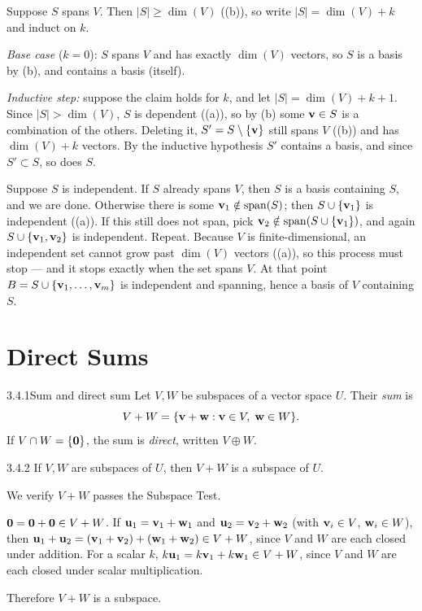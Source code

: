 \begin{prf}
 Suppose $S$ spans $V$. Then $|S|\ge\dim(V)$ ((b)), so write $|S|=\dim(V)+k$ and induct on $k$.

\emph{Base case} ($k=0$): $S$ spans $V$ and has exactly $\dim(V)$ vectors, so $S$ is a basis by (b), and contains a basis (itself).

\emph{Inductive step:} suppose the claim holds for $k$, and let $|S|=\dim(V)+k+1$. Since $|S|>\dim(V)$, $S$ is dependent ((a)), so by (b) some $\mathbf{v}\in S$ is a combination of the others. Deleting it, $S'=S\setminus\{\mathbf{v}\}$ still spans $V$ ((b)) and has $\dim(V)+k$ vectors. By the inductive hypothesis $S'$ contains a basis, and since $S'\subset S$, so does $S$.

 Suppose $S$ is independent. If $S$ already spans $V$, then $S$ is a basis containing $S$, and we are done. Otherwise there is some $\mathbf{v}_1\notin\operatorname{span}(S)$; then $S\cup\{\mathbf{v}_1\}$ is independent ((a)).
If this still does not span, pick $\mathbf{v}_2\notin\operatorname{span}(S\cup\{\mathbf{v}_1\})$, and again $S\cup\{\mathbf{v}_1,\mathbf{v}_2\}$ is independent. Repeat. Because $V$ is finite-dimensional, an independent set cannot grow past $\dim(V)$ vectors ((a)), so this process must stop --- and it stops exactly when the set spans $V$. At that point $B=S\cup\{\mathbf{v}_1,\dots,\mathbf{v}_m\}$ is independent and spanning, hence a basis of $V$ containing $S$.
\end{prf}

\section{Direct Sums}
\label{sec:3.4}

\begin{defns}{3.4.1}{Sum and direct sum}
Let $V,W$ be subspaces of a vector space $U$. Their \emph{sum} is
\[
V+W=\{\mathbf{v}+\mathbf{w}:\mathbf{v}\in V,\;\mathbf{w}\in W\}.
\]
If $V\cap W=\{\mathbf{0}\}$, the sum is \emph{direct}, written $V\oplus W$.
\end{defns}

\begin{thms}{3.4.2}{}
If $V,W$ are subspaces of $U$, then $V+W$ is a subspace of $U$.
\end{thms}

\begin{prf}
We verify $V+W$ passes the Subspace Test.
\begin{checks}
 $\mathbf{0}=\mathbf{0}+\mathbf{0}\in V+W$.
 If $\mathbf{u}_1=\mathbf{v}_1+\mathbf{w}_1$ and $\mathbf{u}_2=\mathbf{v}_2+\mathbf{w}_2$ (with $\mathbf{v}_i\in V$, $\mathbf{w}_i\in W$), then $\mathbf{u}_1+\mathbf{u}_2=(\mathbf{v}_1+\mathbf{v}_2)+(\mathbf{w}_1+\mathbf{w}_2)\in V+W$, since $V$ and $W$ are each closed under addition.
 For a scalar $k$, $k\mathbf{u}_1=k\mathbf{v}_1+k\mathbf{w}_1\in V+W$, since $V$ and $W$ are each closed under scalar multiplication.
\end{checks}
Therefore $V+W$ is a subspace.
\end{prf}

